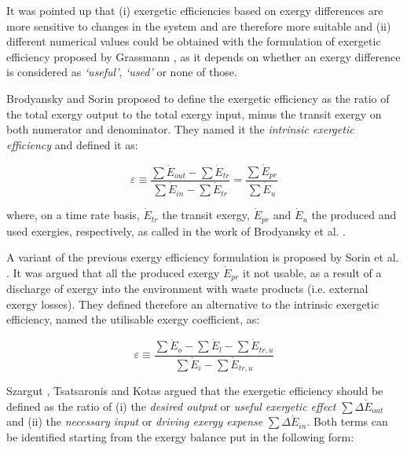 It was pointed up that (i) exergetic efficiencies based on exergy differences are more sensitive to changes in the system and are therefore more suitable and (ii) different numerical values could be obtained with the formulation of exergetic efficiency proposed by Grassmann \cite{Grassmann1950}, as it depends on whether an exergy difference is considered as \emph{`useful'}, \emph{`used'} or none of those.


Brodyansky \cite{Brodyansky1994} and Sorin \cite{Sorin1994} proposed to define the exergetic efficiency as the ratio of the total exergy output to the total exergy input, minus the transit exergy on both numerator and denominator. They named it the \emph{intrinsic exergetic efficiency} and defined it as:

\begin{equation}
\varepsilon \equiv \frac{\sum \dot{E}_{out}-\sum \dot{E}_{tr}}{\sum \dot{E}_{in}-\sum \dot{E}_{tr}} = \frac{\sum \dot{E}_{pr}}{\sum \dot{E}_u}
\end{equation}

	where, on a time rate basis, $\dot{E}_{tr}$ the transit exergy, $\dot{E}_{pr}$ and $\dot{E}_{u}$ the produced and used exergies, respectively, as called in the work of Brodyansky et al. \cite{Brodyansky1994}.  

A variant of the previous exergy efficiency formulation is proposed by Sorin et al. \cite{Sorin1998}. It was argued that all the produced exergy $\dot{E}_{pr}$ it not usable, as a result of a discharge of exergy into the environment with waste products (i.e. external exergy losses). They defined therefore an alternative to the intrinsic exergetic efficiency, named the utilisable exergy coefficient, as:

\begin{equation}
\varepsilon \equiv \frac{\sum \dot{E}_{o}-\sum \dot{E}_{l}-\sum \dot{E}_{tr,u}}{\sum \dot{E}_{i}-\sum \dot{E}_{tr,u}}
\end{equation}

 Szargut \cite{Szargut1980,Szargut1988,Szargut1998}, Tsatsaronis \cite{Tsatsaronis1985} and Kotas \cite{Kotas1980a,Kotas1995} argued that the exergetic efficiency should be defined as the ratio of (i) the \emph{desired output} or \emph{useful exergetic effect} $\sum \Delta \dot{E}_{out}$ and (ii) the \emph{necessary input} or \emph{driving exergy expense} $\sum \Delta \dot{E}_{in}$. Both terms can be identified starting from the exergy balance put in the following form:

